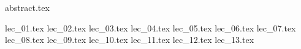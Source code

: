 \documentclass[a4paper,german, git, fancyfoot]{mkessler-script}
\author{Maximilian Keßler}
\begin{document}
    \maketitle

    {abstract.tex}


    \newpage
    \tableofcontents

    \newpage
    \summaryoflectures

    \newpage
    {lec_01.tex}
    {lec_02.tex}
    {lec_03.tex}
    {lec_04.tex}
    {lec_05.tex}
    {lec_06.tex}
    {lec_07.tex}
    {lec_08.tex}
    {lec_09.tex}
    {lec_10.tex}
    {lec_11.tex}
    {lec_12.tex}
    {lec_13.tex}
    \printindex
\end{document}
